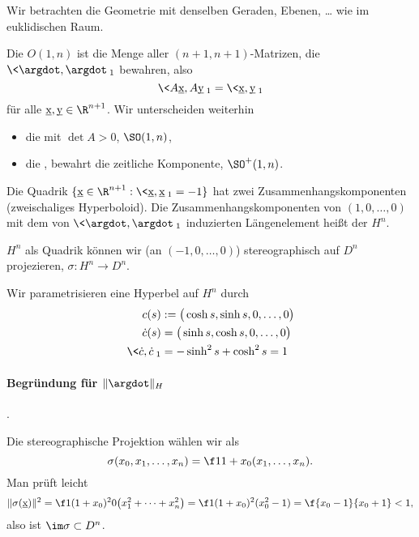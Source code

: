 Wir betrachten die Geometrie mit denselben Geraden, Ebenen, … wie im euklidischen Raum.

\begin{df}
	Die  $O(1, n)$ ist die Menge aller $(n+1, n+1)$-Matrizen, die $\<\argdot, \argdot\>_1$ bewahren, also
	\[
		\< A\v x, A\v y\>_1 = \< \v x, \v y \>_1
	\]
	für alle $\v x, \v y \in \R^{n+1}$.
	Wir unterscheiden weiterhin
	\begin{itemize}
		\item
			die  mit $\det A > 0$, $\SO(1, n)$,
		\item
			die , bewahrt die zeitliche Komponente, $\SO^+(1, n)$.
	\end{itemize}
\end{df}

\begin{df}
	Die Quadrik $\{\v x \in \R^{n+1} : \<\v x, \v x\>_1 = -1 \}$ hat zwei Zusammenhangskomponenten (zweischaliges Hyperboloid).
	Die Zusammenhangskomponenten von $(1, 0, \dotsc, 0)$ mit dem von $\<\argdot, \argdot\>_1$ induzierten Längenelement heißt der  $H^n$.
\end{df}

$H^n$ als Quadrik können wir (an $(-1, 0, \dotsc, 0)$) stereographisch auf $D^n$ projezieren, $\sigma: H^n \to D^n$.
\Exercise

Wir parametrisieren eine Hyperbel auf $H^n$ durch
\begin{align*}
	c(s) &:= \big( \cosh s, \sinh s, 0, \dotsc, 0 \big) \\
	\dot c (s) &= \big( \sinh s, \cosh s, 0, \dotsc, 0 \big) \\
	\<\dot c, \dot c\>_1 &= - \sinh^2 s + \cosh^2 s = 1
\end{align*}

\paragraph{Begründung für $\|\argdot\|_H$}.

Die stereographische Projektion wählen wir als
\[
	\sigma(x_0, x_1, \dotsc, x_n) = \f 1{1+ x_0} (x_1, \dotsc, x_n).
\]
Man prüft leicht
\[
	\|\sigma(\v x)\|^2
	= \f 1{(1+x_0)^2}0\big( x_1 ^2 + \dotsb + x_n^2 \big)
	= \f 1{(1+x_0)^2} (x_0^2 - 1) = \f {x_0 - 1}{x_0 + 1} < 1,
\]
also ist $\im \sigma \subset D^n$.

